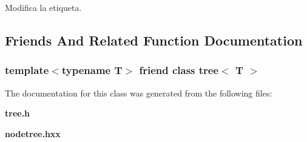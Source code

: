 Modifica la etiqueta. 



\subsection{Friends And Related Function Documentation}
\subsubsection[{tree$<$ T $>$}]{\setlength{\rightskip}{0pt plus 5cm}template$<$typename T$>$ friend class {\bf tree}$<$ T $>$\hspace{0.3cm}{\ttfamily [friend]}}\label{classtree_1_1node_a580e66a56b1685f2fc7e95ded824a4b6}


The documentation for this class was generated from the following files\+:\begin{DoxyCompactItemize}
\item 
{\bf tree.\+h}\item 
{\bf nodetree.\+hxx}\end{DoxyCompactItemize}
